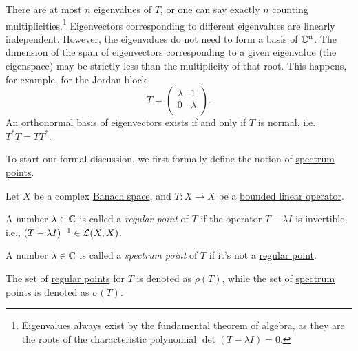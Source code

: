 There are at most \(n\) eigenvalues of \(T\), or one can say exactly \(n\) counting multiplicities.\footnote{Eigenvalues always exist by the \href{https://en.wikipedia.org/wiki/Fundamental_theorem_of_algebra}{fundamental theorem of algebra}, as they are the roots of the characteristic polynomial \(\det(T - \lambda I) = 0 \).} Eigenvectors corresponding to different eigenvalues are linearly independent. However, the eigenvalues do not need to form a basis of \(\mathbb{\MakeUppercase{c}} ^n\). The dimension of the span of eigenvectors corresponding to a given eigenvalue (the eigenspace) may be strictly less than the multiplicity of that root. This happens, for example, for the Jordan block
\[
	T = \begin{pmatrix}
		\lambda & 1       \\
		0       & \lambda \\
	\end{pmatrix}.
\]
An \hyperref[def:orthonormal-system]{orthonormal} basis of eigenvectors exists if and only if \(T\) is \hyperref[def:normal-op]{normal}, i.e. \(T^{\ast} T = TT^{\ast} \).

To start our formal discussion, we first formally define the notion of \hyperref[def:spectrum-point]{spectrum points}.

\begin{definition*}
	Let \(X\) be a complex \hyperref[def:Banach-space]{Banach space}, and \(T\colon X \to X\) be a \hyperref[def:bounded-linear-op]{bounded linear operator}.
	\begin{definition}\label{def:regular-point}
		A number \(\lambda \in \mathbb{\MakeUppercase{c}} \) is called a \emph{regular point} of \(T\) if the operator \(T-\lambda I\) is invertible, i.e., \((T-\lambda I)^{-1} \in \mathcal{\MakeUppercase{l}} (X, X)\).
	\end{definition}
	\begin{definition}\label{def:spectrum-point}
		A number \(\lambda \in \mathbb{\MakeUppercase{c}} \) is called a \emph{spectrum point} of \(T\) if it's not a \hyperref[def:regular-point]{regular point}.
	\end{definition}
\end{definition*}

\begin{notation}
	The set of \hyperref[def:regular-point]{regular points} for \(T\) is denoted as \(\rho (T)\), while the set of \hyperref[def:spectrum-point]{spectrum points} is denoted as \(\sigma (T)\).
\end{notation}

